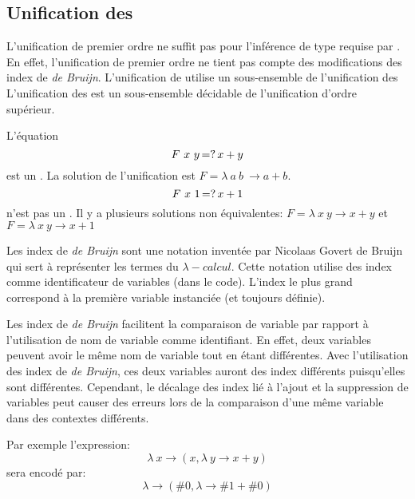         \subsection{Unification des \hop{}}
            \structpar{\hop{}}
                L'unification de premier ordre ne suffit pas pour l'inférence de type requise par \typer{}.
                En effet, l'unification de premier ordre ne tient pas compte des modifications des index de \textit{de Bruijn}.
                L'unification de \typer{} utilise un sous-ensemble de l'unification des \hop{}
                L'unification des \hop{} est un sous-ensemble décidable de l'unification d'ordre supérieur.

                L'équation
                \begin{equation}
                    F\ x\ y \operatorname{\mathbin{=?}} x + y
                \end{equation}
                est un \hop{}. La solution de l'unification est $F = \lambda\ a\ b\ \rightarrow a + b$.
                \begin{equation}
                    F\ x\ 1 \operatorname{\mathbin{=?}} x + 1
                \end{equation}
                n'est pas un \hop{}. Il y a plusieurs solutions non équivalentes: $F = \lambda\ x\ y \rightarrow x + y$ et $F = \lambda\ x\ y \rightarrow x + 1$

                Les index de \textit{de Bruijn} sont une notation inventée par Nicolaas Govert de Bruijn qui sert à représenter les
                termes du $\lambda{}-calcul$. Cette notation utilise des index comme identificateur de variables (dans le code). L'index le plus grand
                correspond à la première variable instanciée (et toujours définie).

                Les index de \textit{de Bruijn} facilitent la comparaison de variable par rapport à l'utilisation de nom de variable comme identifiant.
                En effet, deux variables peuvent avoir le même nom de variable tout en étant différentes. Avec l'utilisation des index de \textit{de Bruijn},
                ces deux variables auront des index différents puisqu'elles sont différentes.
                Cependant, le décalage des index lié à l'ajout et la suppression de variables peut causer des erreurs lors de la comparaison d'une même
                variable dans des contextes différents.

                Par exemple l'expression:
                \begin{equation}
                    \lambda\ x \rightarrow (x, \lambda\ y \rightarrow x + y)
                \end{equation}
                sera encodé par:
                \begin{equation}
                    \lambda \rightarrow (\#0, \lambda \rightarrow \#1 + \#0)
                \end{equation}

